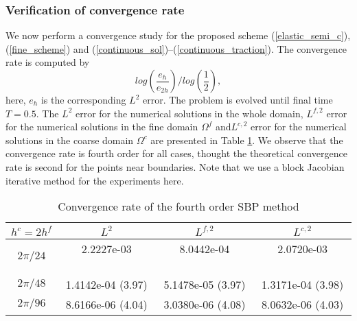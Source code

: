 \subsubsection{Verification of convergence rate}\label{convergence_study}
We now perform a convergence study for the proposed scheme (\ref{elastic_semi_c}), (\ref{fine_scheme}) and (\ref{continuous_sol})--(\ref{continuous_traction}). The convergence rate is computed by
\[log\left(\frac{e_h}{e_{2h}}\right)\Bigg/log\left(\frac{1}{2}\right),\]
here, $e_h$ is the corresponding $L^2$ error.  The problem is evolved until final time $T = 0.5$. The $L^2$ error for the numerical solutions in the whole domain, $L^{f,2}$ error for the numerical solutions in the fine domain $\Omega^f$ and$L^{c,2}$ error for the numerical solutions in the coarse domain $\Omega^c$ are presented in Table \ref{convergence_rate}. We observe that the convergence rate is fourth order for all cases, thought the theoretical convergence rate is second for the points near boundaries. Note that we use a block Jacobian iterative method for the experiments here.

\begin{table}[htb]
	\begin{center}
		\begin{tabular}{|c|c c c|}
			\hline
			$h^c = 2h^f$   & $L^2$ & $L^{f,2}$ & $L^{c,2}$  \\
			\hline
			$2\pi/24$ &2.2227e-03 ~~~~~~~~ & 8.0442e-04 ~~~~~~~~ & 2.0720e-03 ~~~~~~~~\\
			\hline
			$2\pi/48$ &1.4142e-04 (3.97) & 5.1478e-05 (3.97) & 1.3171e-04 (3.98)\\
			\hline 
			$2\pi/96$ &8.6166e-06 (4.04) & 3.0380e-06 (4.08) & 8.0632e-06 (4.03)\\
			\hline
		\end{tabular}
	\end{center}
	\caption{Convergence rate of the fourth order SBP method}\label{convergence_rate}
\end{table} 
